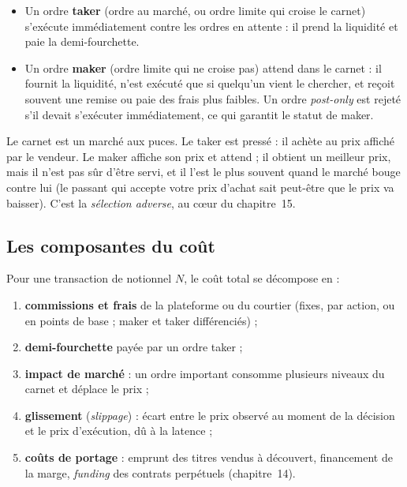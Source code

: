 \begin{itemize}
\item Un ordre \textbf{taker} (ordre au marché, ou ordre limite qui croise le carnet) s'exécute immédiatement contre les ordres en attente : il \og prend\fg{} la liquidité et paie la demi-fourchette.
\item Un ordre \textbf{maker} (ordre limite qui ne croise pas) attend dans le carnet : il \og fournit\fg{} la liquidité, n'est exécuté que si quelqu'un vient le chercher, et reçoit souvent une remise ou paie des frais plus faibles. Un ordre \emph{post-only} est rejeté s'il devait s'exécuter immédiatement, ce qui garantit le statut de maker.
\end{itemize}

\begin{intuition}
Le carnet est un marché aux puces. Le taker est pressé : il achète au prix affiché par le vendeur. Le maker affiche son prix et attend ; il obtient un meilleur prix, mais il n'est pas sûr d'être servi, et il l'est le plus souvent quand le marché bouge contre lui (le passant qui accepte votre prix d'achat sait peut-être que le prix va baisser). C'est la \emph{sélection adverse}, au cœur du chapitre~15.
\end{intuition}

\subsection{Les composantes du coût}

Pour une transaction de notionnel $N$, le coût total se décompose en :
\begin{enumerate}
\item \textbf{commissions et frais} de la plateforme ou du courtier (fixes, par action, ou en points de base ; maker et taker différenciés) ;
\item \textbf{demi-fourchette} payée par un ordre taker ;
\item \textbf{impact de marché} : un ordre important consomme plusieurs niveaux du carnet et déplace le prix ;
\item \textbf{glissement} (\emph{slippage}) : écart entre le prix observé au moment de la décision et le prix d'exécution, dû à la latence ;
\item \textbf{coûts de portage} : emprunt des titres vendus à découvert, financement de la marge, \emph{funding} des contrats perpétuels (chapitre~14).
\end{enumerate}

